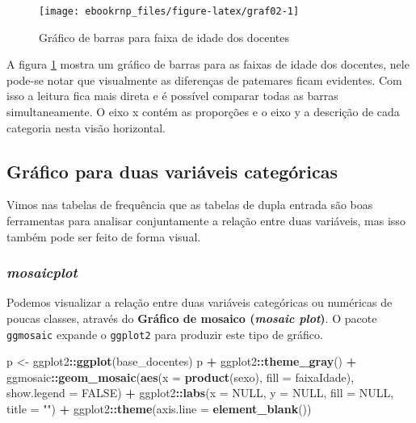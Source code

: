 \documentclass[11pt,]{style/krantz}
\makeatletter
\newenvironment{Shaded}{\begin{snugshade}}{\end{snugshade}}
\newcommand{\DataTypeTok}[1]{\textcolor[rgb]{0.13,0.29,0.53}{#1}}
\newcommand{\KeywordTok}[1]{\textcolor[rgb]{0.13,0.29,0.53}{\textbf{#1}}}
\newcommand{\NormalTok}[1]{#1}
\newcommand{\OperatorTok}[1]{\textcolor[rgb]{0.81,0.36,0.00}{\textbf{#1}}}
\newcommand{\OtherTok}[1]{\textcolor[rgb]{0.56,0.35,0.01}{#1}}
\newcommand{\StringTok}[1]{\textcolor[rgb]{0.31,0.60,0.02}{#1}}
\newenvironment{kframe}{%
\medskip{}
\setlength{\fboxsep}{.8em}
 \def\at@end@of@kframe{}%
 \ifinner\ifhmode%
  \def\at@end@of@kframe{\end{minipage}}%
  \begin{minipage}{\columnwidth}%
 \fi\fi%
 \def\FrameCommand##1{\hskip\@totalleftmargin \hskip-\fboxsep
 \colorbox{shadecolor}{##1}\hskip-\fboxsep
     \hskip-\linewidth \hskip-\@totalleftmargin \hskip\columnwidth}%
 \MakeFramed {\advance\hsize-\width
   \@totalleftmargin\z@ \linewidth\hsize
   \@setminipage}}%
 {\par\unskip\endMakeFramed%
 \at@end@of@kframe}
\renewenvironment{Shaded}{\begin{kframe}}{\end{kframe}}
\theoremstyle{definition}
\theoremstyle{definition}
\theoremstyle{definition}
\theoremstyle{remark}
\makeatother
\begin{document}
\begin{figure}[H]

{\centering \texttt{[image: ebookrnp\_files/figure-latex/graf02-1]} 

}

\caption{Gráfico de barras para faixa de idade dos docentes}\label{fig:graf02}
\end{figure}

A figura \ref{fig:graf02} mostra um gráfico de barras para as faixas de idade dos docentes, nele pode-se notar que visualmente as diferenças de patemares ficam evidentes. Com isso a leitura fica mais direta e é possível comparar todas as barras simultaneamente. O eixo x contém as proporções e o eixo y a descrição de cada categoria nesta visão horizontal.

\hypertarget{grafico-para-duas-variaveis-categoricas}{%
\subsection{Gráfico para duas variáveis categóricas}\label{grafico-para-duas-variaveis-categoricas}}

Vimos nas tabelas de frequência que as tabelas de dupla entrada são boas ferramentas para analisar conjuntamente a relação entre duas variáveis, mas isso também pode ser feito de forma visual.

\hypertarget{mosaicplot}{%
\subsubsection{\texorpdfstring{\emph{mosaicplot}}{mosaicplot}}\label{mosaicplot}}

Podemos visualizar a relação entre duas variáveis categóricas ou numéricas de poucas classes, através do \textbf{Gráfico de mosaico (\emph{mosaic plot})}. O pacote \texttt{ggmosaic} expande o \texttt{ggplot2} para produzir este tipo de gráfico.

\begin{Shaded}
\begin{Highlighting}[]
\NormalTok{p <-}\StringTok{ }\NormalTok{ggplot2}\OperatorTok{::}\KeywordTok{ggplot}\NormalTok{(base_docentes)}
\NormalTok{p }\OperatorTok{+}\StringTok{ }\NormalTok{ggplot2}\OperatorTok{::}\KeywordTok{theme_gray}\NormalTok{() }\OperatorTok{+}
\StringTok{  }\NormalTok{ggmosaic}\OperatorTok{::}\KeywordTok{geom_mosaic}\NormalTok{(}\KeywordTok{aes}\NormalTok{(}\DataTypeTok{x =} \KeywordTok{product}\NormalTok{(sexo), }\DataTypeTok{fill =}\NormalTok{ faixaIdade), }
                        \DataTypeTok{show.legend =} \OtherTok{FALSE}\NormalTok{) }\OperatorTok{+}
\StringTok{  }\NormalTok{ggplot2}\OperatorTok{::}\KeywordTok{labs}\NormalTok{(}\DataTypeTok{x =} \OtherTok{NULL}\NormalTok{, }\DataTypeTok{y =} \OtherTok{NULL}\NormalTok{, }\DataTypeTok{fill =} \OtherTok{NULL}\NormalTok{, }\DataTypeTok{title =} \StringTok{""}\NormalTok{) }\OperatorTok{+}
\StringTok{  }\NormalTok{ggplot2}\OperatorTok{::}\KeywordTok{theme}\NormalTok{(}\DataTypeTok{axis.line =} \KeywordTok{element_blank}\NormalTok{())}
\end{Highlighting}
\end{Shaded}
\end{document}
